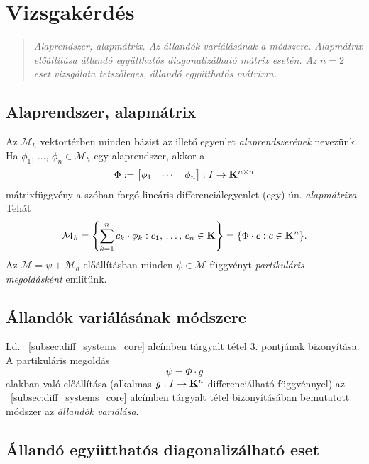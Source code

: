\newpage
\section{Vizsgakérdés}
\begin{quote}
	\textit{Alaprendszer, alapmátrix. Az állandók variálásának a módszere. Alapmátrix előállítása állandó együtthatós diagonalizálható mátrix esetén. Az $n=2$ eset vizsgálata tetszőleges, állandó együtthatós mátrixra.}
\end{quote}

\subsection{Alaprendszer, alapmátrix}

Az $\mathcal{M}_h$ vektortérben minden bázist az illető egyenlet \textit{alaprendszerének} nevezünk. Ha $\phi_1, \, \dots, \, \phi_n \in \mathcal{M}_h$ egy alaprendszer, akkor a
\[
	\Phi := \begin{bmatrix}
		\phi_1 & \cdots & \phi_n
	\end{bmatrix} : I \to \mathbf{K}^{n \times n}
\]
mátrixfüggvény a szóban forgó lineáris differenciálegyenlet (egy) ún. \textit{alapmátrixa}. Tehát
\[
	\mathcal{M}_h = \left\{ \sum_{k=1}^n c_k \cdot \phi_k : c_1, \, \dots, \, c_n \in \mathbf{K} \right\} = \{ \Phi \cdot c : c \in \mathbf{K}^n \}.
\]
Az $\mathcal{M} = \psi + \mathcal{M}_h$ előállításban minden $\psi \in \mathcal{M}$ függvényt \textit{partikuláris megoldásként} említünk.

\subsection{Állandók variálásának módszere}
Ld. ~\ref{subsec:diff_systems_core} alcímben tárgyalt tétel 3. pontjának bizonyítása. A partikuláris megoldás
\[
	\psi = \Phi \cdot g
\]
alakban való előállítása (alkalmas $g : I \to \mathbf{K}^n$ differenciálható függvénnyel) az ~\ref{subsec:diff_systems_core} alcímben tárgyalt tétel bizonyításában bemutatott módszer az \textit{állandók variálása}.

\subsection{Állandó együtthatós diagonalizálható eset}

